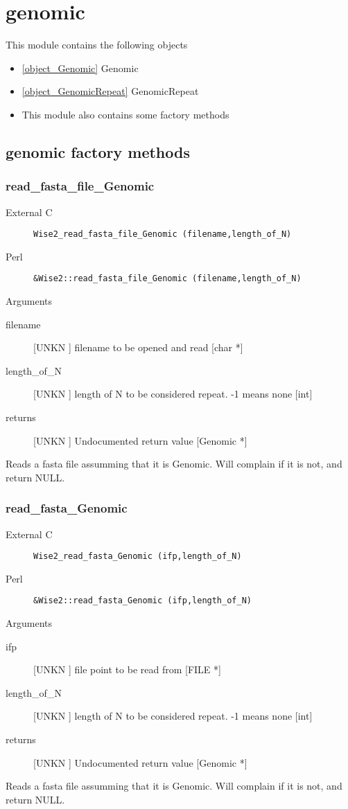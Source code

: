 \section{genomic}
\label{module_genomic}
This module contains the following objects

\begin{itemize}
\item \ref{object_Genomic} Genomic

\item \ref{object_GenomicRepeat} GenomicRepeat

\item This module also contains some factory methods
\end{itemize}
\subsection{genomic factory methods}
\subsubsection{read_fasta_file_Genomic}
\begin{description}
\item[External C] {\tt Wise2_read_fasta_file_Genomic (filename,length_of_N)}
\item[Perl] {\tt &Wise2::read_fasta_file_Genomic (filename,length_of_N)}

\end{description}
Arguments
\begin{description}
\item[filename] [UNKN ] filename to be opened and read [char *]
\item[length_of_N] [UNKN ] length of N to be considered repeat. -1 means none [int]
\item[returns] [UNKN ] Undocumented return value [Genomic *]
\end{description}
Reads a fasta file assumming that it is Genomic. 
Will complain if it is not, and return NULL.


\subsubsection{read_fasta_Genomic}
\begin{description}
\item[External C] {\tt Wise2_read_fasta_Genomic (ifp,length_of_N)}
\item[Perl] {\tt &Wise2::read_fasta_Genomic (ifp,length_of_N)}

\end{description}
Arguments
\begin{description}
\item[ifp] [UNKN ] file point to be read from [FILE *]
\item[length_of_N] [UNKN ] length of N to be considered repeat. -1 means none [int]
\item[returns] [UNKN ] Undocumented return value [Genomic *]
\end{description}
Reads a fasta file assumming that it is Genomic. 
Will complain if it is not, and return NULL.


